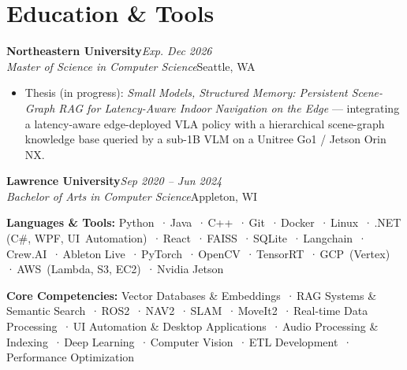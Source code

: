 \documentclass[11pt, letterpaper]{article}
\newcommand{\bull}{\,·\,}
\newcommand{\entrysub}[2]{%
    \noindent\textit{#1}\hfill#2\\[-5pt]%
}
\newcommand{\eduhead}[2]{%
    \noindent\textbf{#1}\hfill\textit{#2}\\%
}
\begin{document}
\section{Education \& Tools}

\eduhead{Northeastern University}{Exp. Dec 2026}
\entrysub{Master of Science in Computer Science}{Seattle, WA}
\begin{itemize}
    \item Thesis (in progress): \textit{Small Models, Structured Memory: Persistent Scene-Graph RAG for Latency-Aware Indoor Navigation on the Edge} --- integrating a latency-aware edge-deployed VLA policy with a hierarchical scene-graph knowledge base queried by a sub-1B VLM on a Unitree Go1 / Jetson Orin NX.
\end{itemize}

\vspace{6pt}

\eduhead{Lawrence University}{Sep 2020 -- Jun 2024}
\entrysub{Bachelor of Arts in Computer Science}{Appleton, WI}

\vspace{8pt}

\noindent\textbf{Languages \& Tools:}
Python \bull Java \bull C++ \bull Git \bull Docker \bull Linux \bull .NET (C\#, WPF, UI~Automation) \bull React \bull FAISS \bull SQLite \bull Langchain \bull Crew.AI \bull Ableton Live \bull PyTorch \bull OpenCV \bull TensorRT \bull GCP~(Vertex) \bull AWS~(Lambda, S3, EC2) \bull Nvidia Jetson

\vspace{4pt}

\noindent\textbf{Core Competencies:}
Vector Databases \& Embeddings \bull RAG Systems \& Semantic Search \bull ROS2 \bull NAV2 \bull SLAM \bull MoveIt2 \bull Real-time Data Processing \bull UI Automation \& Desktop Applications \bull Audio Processing \& Indexing \bull Deep Learning \bull Computer Vision \bull ETL Development \bull Performance Optimization
\end{document}

